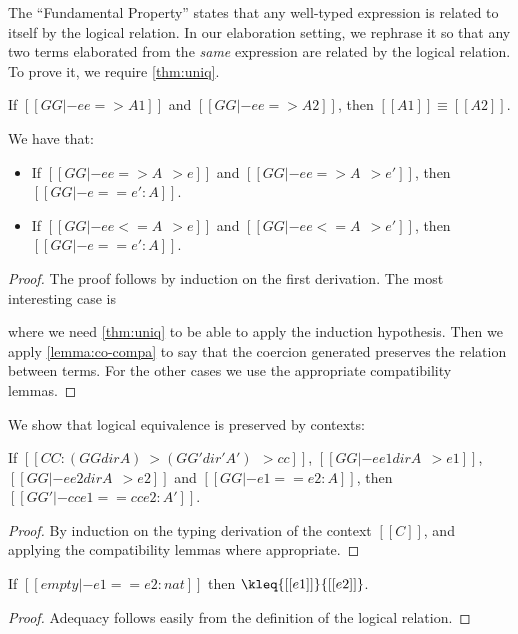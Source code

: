 The ``Fundamental Property'' states that any well-typed expression is related to
itself by the logical relation. In our elaboration setting, we rephrase it so
that any two \tname terms elaborated from the \textit{same} \namee expression are related
by the logical relation. To prove it, we require \cref{thm:uniq}.

\begin{theorem} \label{thm:uniq}
  If $[[GG |- ee => A1]]$ and $[[GG |- ee => A2]]$, then $[[A1]] \equiv [[A2]]$.
\end{theorem}

\begin{theorem}  \label{thm:co-log} We have that:
  \begin{itemize}
  \item If $[[GG |- ee => A ~~> e]]$ and $[[GG |- ee => A ~~> e']]$, then $[[GG |- e == e' : A ]]$.
  \item If $[[GG |- ee <= A ~~> e]]$ and $[[GG |- ee <= A ~~> e']]$, then $[[GG |- e == e' : A ]]$.
  \end{itemize}
\end{theorem}
\begin{proof}
  The proof follows by induction on the first derivation. The most interesting
  case is 
  \begin{mathpar}
  \end{mathpar}
  where we need \cref{thm:uniq} to be able to apply the induction hypothesis.
  Then we apply \cref{lemma:co-compa} to say that the coercion generated
  preserves the relation between terms. For the other cases we use the
  appropriate compatibility lemmas.
\end{proof}


We show that logical equivalence is preserved by \namee contexts:

\begin{lemma}[Congruence] \label{lemma:cong}
 If $[[CC : (GG dir A) ~> (GG' dir' A') ~~> cc]]$, $[[GG |- ee1 dir A ~~> e1]]$, $[[GG |- ee2 dir A ~~> e2]]$
 and $[[GG |- e1 == e2 : A]]$, then $[[GG' |- cc{e1} == cc{e2} : A']]$.
\end{lemma}
\begin{proof}
  By induction on the typing derivation of the context $[[C]]$, and applying
  the compatibility lemmas where appropriate.
\end{proof}


\begin{lemma}[Adequacy] \label{lemma:ade}
  If $[[  empty |- e1 == e2 : nat ]]$ then $\kleq{[[e1]]}{[[e2]]}$.
\end{lemma}
\begin{proof}
  Adequacy follows easily from the definition of the logical relation.
\end{proof}


